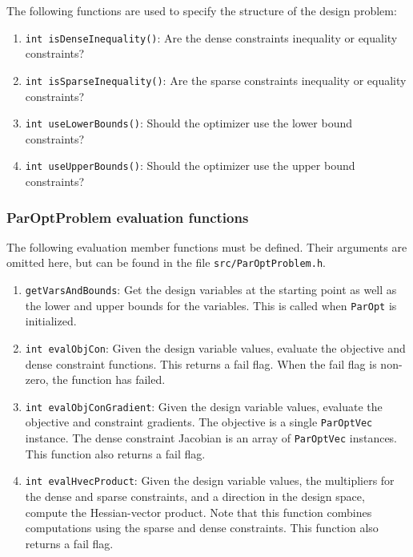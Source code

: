 \documentclass[12pt]{article}
\begin{document}
The following functions are used to specify the structure of the design problem:
\begin{enumerate}
\item \texttt{int isDenseInequality()}: Are the dense constraints inequality or equality constraints?
\item \texttt{int isSparseInequality()}: Are the sparse constraints inequality or equality constraints?
\item \texttt{int useLowerBounds()}: Should the optimizer use the lower bound constraints?
\item \texttt{int useUpperBounds()}: Should the optimizer use the upper bound constraints?
\end{enumerate}

\subsubsection{ParOptProblem evaluation functions}

The following evaluation member functions must be defined. Their arguments are omitted here, but can be found
in the file \texttt{src/ParOptProblem.h}.
\begin{enumerate}
\item \texttt{getVarsAndBounds}: Get the design variables at the starting point as well as the lower and upper bounds for the variables. This is called when \texttt{ParOpt} is initialized.

\item \texttt{int evalObjCon}: Given the design variable values, evaluate the objective and dense constraint functions. This returns a fail flag. When the fail flag is non-zero, the function has failed.

\item \texttt{int evalObjConGradient}: Given the design variable values, evaluate the objective and constraint gradients. The objective is a single \texttt{ParOptVec} instance. The dense constraint Jacobian is an array of \texttt{ParOptVec} instances. This function also returns a fail flag.

\item \texttt{int evalHvecProduct}: Given the design variable values, the multipliers for the dense and sparse constraints, and a direction in the design space, compute the Hessian-vector product. Note that this function combines computations using the sparse and dense constraints. This function also returns a fail flag.
\end{enumerate}
\end{document}
